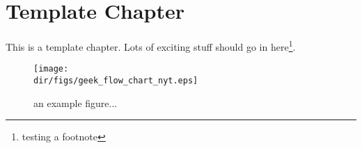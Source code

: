 \chapter{Template Chapter}
This is a template chapter. Lots of exciting stuff should go in here\footnote{testing a footnote}.


\begin{figure}[htbp]
  \centering
  \texttt{[image: \\dir/figs/geek\_flow\_chart\_nyt.eps]}
  \caption{an example figure...}
  \label{fig.example}
\end{figure}

